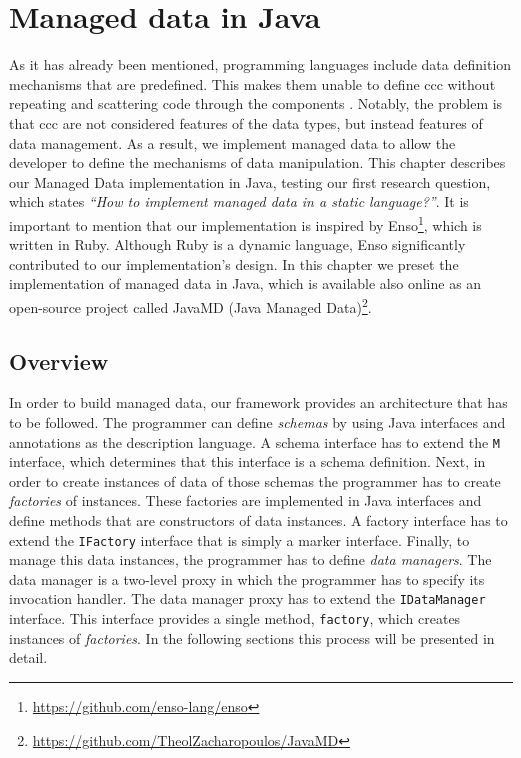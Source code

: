 
\chapter{Managed data in Java}\label{Implementation}

As it has already been mentioned, programming languages include data definition mechanisms that are predefined. 
This makes them unable to define \ac{ccc} without repeating and scattering code through the components \cite{loh2012managed}.
Notably, the problem is that \ac{ccc} are not considered features of the data types, but instead features of data management.
As a result, we implement managed data to allow the developer to define the mechanisms of data manipulation.
This chapter describes our Managed Data implementation in Java, testing our first research question, which states \textit{``How to implement managed data in a static language?''}.
It is important to mention that our implementation is inspired by Enso\footnote{\url{https://github.com/enso-lang/enso}}, which is written in Ruby.
Although Ruby is a dynamic language, Enso significantly contributed to our implementation's design.
In this chapter we preset the implementation of managed data in Java, which is available also online as an open-source project called JavaMD (Java Managed Data)\footnote{\url{https://github.com/TheolZacharopoulos/JavaMD}}.

\section{Overview}\label{sec:Overview}
In order to build managed data, our framework provides an architecture that has to be followed.
The programmer can define \textit{schemas} by using Java interfaces and annotations as the description language.
A schema interface has to extend the \texttt{M} interface, which determines that this interface is a schema definition.
Next, in order to create instances of data of those schemas the programmer has to create \textit{factories} of instances.
These factories are implemented in Java interfaces and define methods that are constructors of data instances.
A factory interface has to extend the \texttt{IFactory} interface that is simply a marker interface.
Finally, to manage this data instances, the programmer has to define \textit{data managers}.
The data manager is a two-level proxy in which the programmer has to specify its invocation handler.
The data manager proxy has to extend the \texttt{IDataManager} interface.
This interface provides a single method, \texttt{factory}, which creates instances of \textit{factories}.
In the following sections this process will be presented in detail.


